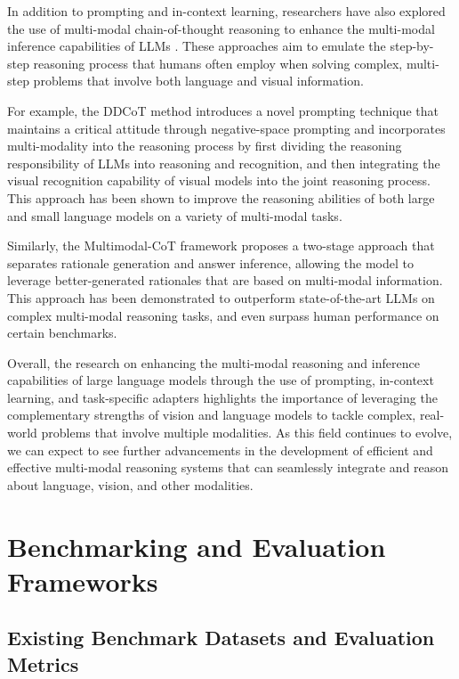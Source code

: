 \documentclass[11pt]{article}
\begin{document}
In addition to prompting and in-context learning, researchers have also explored the use of multi-modal chain-of-thought reasoning to enhance the multi-modal inference capabilities of LLMs \cite{ref145,ref94}. These approaches aim to emulate the step-by-step reasoning process that humans often employ when solving complex, multi-step problems that involve both language and visual information.

For example, the DDCoT method \cite{ref145} introduces a novel prompting technique that maintains a critical attitude through negative-space prompting and incorporates multi-modality into the reasoning process by first dividing the reasoning responsibility of LLMs into reasoning and recognition, and then integrating the visual recognition capability of visual models into the joint reasoning process. This approach has been shown to improve the reasoning abilities of both large and small language models on a variety of multi-modal tasks.

Similarly, the Multimodal-CoT framework \cite{ref94} proposes a two-stage approach that separates rationale generation and answer inference, allowing the model to leverage better-generated rationales that are based on multi-modal information. This approach has been demonstrated to outperform state-of-the-art LLMs on complex multi-modal reasoning tasks, and even surpass human performance on certain benchmarks.

Overall, the research on enhancing the multi-modal reasoning and inference capabilities of large language models through the use of prompting, in-context learning, and task-specific adapters highlights the importance of leveraging the complementary strengths of vision and language models to tackle complex, real-world problems that involve multiple modalities. As this field continues to evolve, we can expect to see further advancements in the development of efficient and effective multi-modal reasoning systems that can seamlessly integrate and reason about language, vision, and other modalities.

\section{Benchmarking and Evaluation Frameworks}

\subsection{Existing Benchmark Datasets and Evaluation Metrics}
\end{document}
